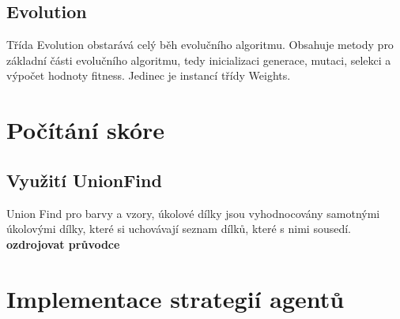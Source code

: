 \subsection{Evolution}
Třída Evolution obstarává celý běh evolučního algoritmu. Obsahuje metody pro základní části evolučního algoritmu, tedy inicializaci generace, mutaci, selekci a výpočet hodnoty fitness. Jedinec je instancí třídy Weights. 

\section{Počítání skóre}
\subsection{Využití UnionFind}

Union Find pro barvy a vzory, úkolové dílky jsou vyhodnocovány samotnými úkolovými dílky, které si uchovávají seznam dílků, které s nimi sousedí.
\textbf{ozdrojovat průvodce}

\section{Implementace strategií agentů}
